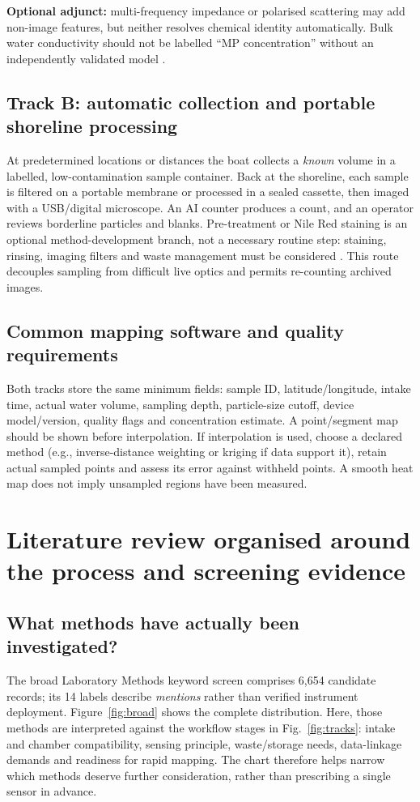 \documentclass[10pt,a4paper]{article}
\begin{document}
\textbf{Optional adjunct:} multi-frequency impedance or polarised scattering may add non-image features, but neither resolves chemical identity automatically. Bulk water conductivity should not be labelled ``MP concentration'' without an independently validated model \cite{Blevins2021,Kim2024,Warraich2025,Polarized2021}.

\subsection{Track B: automatic collection and portable shoreline processing}
At predetermined locations or distances the boat collects a \emph{known} volume in a labelled, low-contamination sample container. Back at the shoreline, each sample is filtered on a portable membrane or processed in a sealed cassette, then imaged with a USB/digital microscope. An AI counter produces a count, and an operator reviews borderline particles and blanks. Pre-treatment or Nile Red staining is an optional method-development branch, not a necessary routine step: staining, rinsing, imaging filters and waste management must be considered \cite{ErniCassola2017,Minor2023,Zhang2023,Lee2022}. This route decouples sampling from difficult live optics and permits re-counting archived images.

\subsection{Common mapping software and quality requirements}
Both tracks store the same minimum fields: sample ID, latitude/longitude, intake time, actual water volume, sampling depth, particle-size cutoff, device model/version, quality flags and concentration estimate. A point/segment map should be shown before interpolation. If interpolation is used, choose a declared method (e.g., inverse-distance weighting or kriging if data support it), retain actual sampled points and assess its error against withheld points. A smooth heat map does not imply unsampled regions have been measured.

\section{Literature review organised around the process and screening evidence}
\subsection{What methods have actually been investigated?}
The broad Laboratory Methods keyword screen comprises 6,654 candidate records; its 14 labels describe \emph{mentions} rather than verified instrument deployment. Figure~\ref{fig:broad} shows the complete distribution. Here, those methods are interpreted against the workflow stages in Fig.~\ref{fig:tracks}: intake and chamber compatibility, sensing principle, waste/storage needs, data-linkage demands and readiness for rapid mapping. The chart therefore helps narrow which methods deserve further consideration, rather than prescribing a single sensor in advance.
\end{document}
